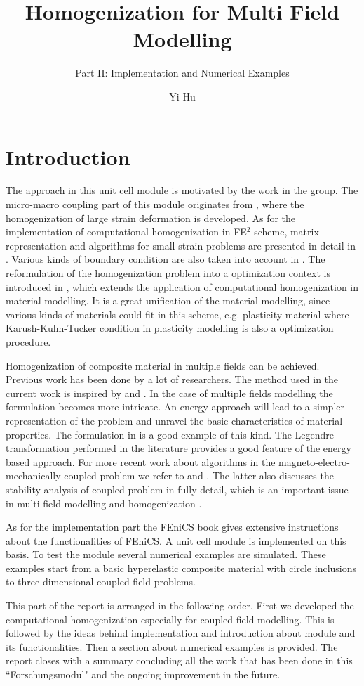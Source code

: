 \documentclass[10pt,a4paper]{scrreprt}
\author{Yi Hu}
\title{Homogenization for Multi Field Modelling}
\subtitle{Part II: Implementation and Numerical Examples}
\begin{document}
\chapter{Introduction}

The approach in this unit cell module is motivated by the work in the group. The micro-macro coupling part of this module originates from \citep{miehe_computational_1999-1}, where the homogenization of large strain deformation is developed. As for the implementation of computational homogenization in FE$^{2}$ scheme, matrix representation and algorithms for small strain problems are presented in detail in \citep{miehe_computational_2002}. Various kinds of boundary condition are also taken into account in \citep{miehe_computational_2002}. The reformulation of the homogenization problem into a optimization context is introduced in \citep{miehe_strain-driven_2002}\citep{miehe_computational_2003} \citep{miehe_homogenization_2002}, which extends the application of computational homogenization in material modelling. It is a great unification of the material modelling, since various kinds of materials could fit in this scheme, e.g. plasticity material where Karush-Kuhn-Tucker condition in plasticity modelling is also a optimization procedure.

Homogenization of composite material in multiple fields can be achieved. Previous work has been done by a lot of researchers. The method used in the current work is inspired by \citep{keip_two-scale_2014} and \citep{schroder_two-scale_2012}. In the case of multiple fields modelling the formulation becomes more intricate. An energy approach will lead to a simpler representation of the problem and unravel the basic characteristics of material properties. The formulation in \citep{miehe_incremental_2011} is a good example of this kind. The Legendre transformation performed in the literature provides a good feature of the energy based approach. For more recent work about algorithms in the magneto-electro-mechanically coupled problem we refer to \citep{schroeder_algorithmic_2016} and \citep{miehe_homogenization_2016}. The latter also discusses the stability analysis of coupled problem in fully detail, which is an important issue in multi field modelling and homogenization \citep{geers_multi-scale_2010}.

As for the implementation part the FEniCS book \citep{wells2012automated} gives extensive instructions about the functionalities of FEniCS. A unit cell module is implemented on this basis. To test the module several numerical examples are simulated. These examples start from a basic hyperelastic composite material with circle inclusions to three dimensional coupled field problems. 

This part of the report is arranged in the following order. First we developed the computational homogenization especially for coupled field modelling. This is followed by the ideas behind implementation and introduction about module and its functionalities. Then a section about numerical examples is provided. The report closes with a summary concluding all the work that has been done in this ``Forschungsmodul" and the ongoing improvement in the future.
\end{document}
